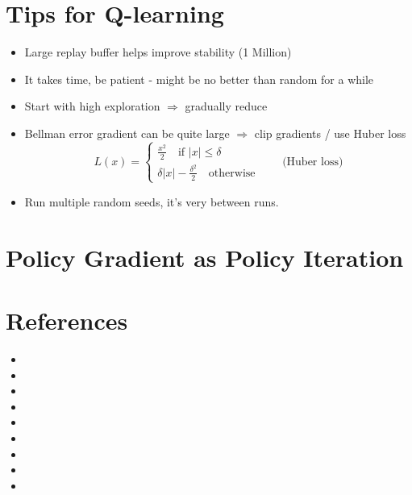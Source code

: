 \section{Tips for Q-learning}
\begin{itemize}
	\item Large replay buffer helps improve stability (1 Million)
	\item It takes time, be patient - might be no better than random for a while
	\item Start with high exploration $\Rightarrow$ gradually reduce
	\item Bellman error gradient can be quite large $\Rightarrow$ clip gradients / use Huber loss
	\begin{equation}
		L(x) = \begin{cases}
			\frac{x^2}{2} \quad \text{if } |x| \leq \delta\\
			\delta|x| - \frac{\delta^2}{2} \quad \text{otherwise}
		\end{cases} \qquad \text{(Huber loss)}
	\end{equation}
	\item Run multiple random seeds, it's very  between runs.	
\end{itemize}

\section{Policy Gradient as Policy Iteration}

\section{References}
\begin{itemize}
	\item {}
	\item {}
	\item {}
	\item {}
	\item {}
	\item {}
	\item {}
	\item {}
	\item {}
\end{itemize}